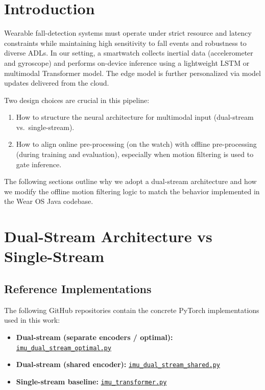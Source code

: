 \section{Introduction}

Wearable fall-detection systems must operate under strict resource and latency constraints while maintaining high sensitivity to fall events and robustness to diverse ADLs. In our setting, a smartwatch collects inertial data (accelerometer and gyroscope) and performs on-device inference using a lightweight LSTM or multimodal Transformer model. The edge model is further personalized via model updates delivered from the cloud.

Two design choices are crucial in this pipeline:
\begin{enumerate}[label=\arabic*.]
    \item How to structure the neural architecture for multimodal input (dual-stream vs.\ single-stream).
    \item How to align online pre-processing (on the watch) with offline pre-processing (during training and evaluation), especially when motion filtering is used to gate inference.
\end{enumerate}

The following sections outline why we adopt a dual-stream architecture and how we modify the offline motion filtering logic to match the behavior implemented in the Wear OS Java codebase.

\section{Dual-Stream Architecture vs Single-Stream}

\subsection*{Reference Implementations}

The following GitHub repositories contain the concrete PyTorch implementations used in this work:
\begin{itemize}
    \item \textbf{Dual-stream (separate encoders / optimal):}
    \href{https://github.com/lolout1/FeatureKD/blob/main/Models/imu_dual_stream_optimal.py}{\texttt{imu\_dual\_stream\_optimal.py}}
    \item \textbf{Dual-stream (shared encoder):}
    \href{https://github.com/lolout1/FeatureKD/blob/main/Models/imu_dual_stream_shared.py}{\texttt{imu\_dual\_stream\_shared.py}}
    \item \textbf{Single-stream baseline:}
    \href{https://github.com/lolout1/FeatureKD/blob/main/Models/imu_transformer.py}{\texttt{imu\_transformer.py}}
\end{itemize}

